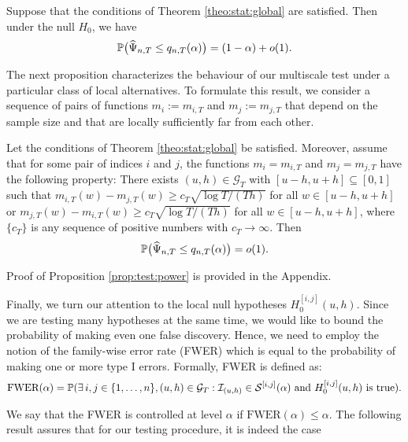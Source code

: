 \documentclass[a4paper,12pt]{article}
\begin{document}
\begin{prop}\label{prop:test}
Suppose that the conditions of Theorem \ref{theo:stat:global} are satisfied. Then under the null $H_0$, we have
\[ \mathbb{P} \big( \widehat{\Psi}_{n,T} \le q_{n,T}(\alpha) \big) = (1 - \alpha) + o(1). \]
\end{prop}

The next proposition characterizes the behaviour of our multiscale test under a particular class of local alternatives. To formulate this result, we consider a sequence of pairs of functions $m_ i := m_{i,T}$ and $m_ j := m_{j,T}$ that depend on the sample size and that are locally sufficiently far from each other.

\begin{prop}\label{prop:test:power}
Let the conditions  of Theorem \ref{theo:stat:global} be satisfied. Moreover, assume that for some pair of indices $i$ and $j$, the functions $m_ i = m_{i,T}$ and $m_ j = m_{j,T}$ have the following property: There exists $(u,h) \in \mathcal{G}_T$ with $[u-h,u+h] \subseteq [0,1]$ such that $m_{i,T}(w) - m_{j,T}(w) \ge c_T \sqrt{\log T/(Th)}$ for all $w \in [u-h,u+h]$ or $m_{j,T}(w) - m_{i,T}(w) \ge c_T \sqrt{\log T/(Th)}$ for all $w \in [u-h,u+h]$, where $\{c_T\}$ is any sequence of positive numbers with $c_T \rightarrow \infty$. Then 
\[ \mathbb{P} \big( \widehat{\Psi}_{n,T} \le q_{n,T}(\alpha) \big) = o(1). \]
\end{prop}

Proof of Proposition \ref{prop:test:power} is provided in the Appendix.

Finally, we turn our attention to the local null hypotheses $H_0^{[i, j]}(u, h)$. Since we are testing many hypotheses at the same time, we would like to bound the probability of making even one false discovery. Hence, we need to employ the notion of the family-wise error rate (FWER) which is equal to the probability of making one or more \linebreak type I errors. Formally, FWER is defined as:
\begin{align*} \text{FWER}(\alpha) = \mathbb{P} (\exists \,  i, j \in \{1, \ldots, n \}, (u, h) \in \mathcal{G}_T: \mathcal{I}_{(u, h)} \in \mathcal{S}^{[i, j]}(\alpha) \text{ and } H_0^{[i, j]}(u, h) \text { is true}).
\end{align*}

We say that the FWER is controlled at level $\alpha$ if $\text{FWER}(\alpha) \leq \alpha$. The following result assures that for our testing procedure, it is indeed the case
\end{document}
